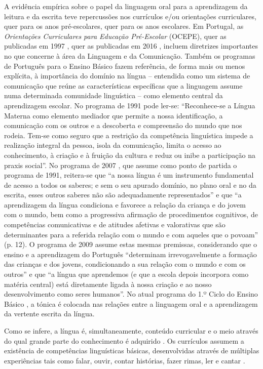 \documentclass[output=paper]{LSP/langsci}
\begin{document}
A evidência empírica sobre o papel da linguagem oral para a aprendizagem da leitura e da escrita teve repercussões nos currículos e/ou orientações curriculares, quer para os anos pré-escolares, quer para os anos escolares. Em Portugal, as \textit{Orientações Curriculares para Educação Pré-Escolar} (OCEPE), quer as publicadas em 1997 \citep{ministerioedu2007}, quer as publicadas em 2016 \citep{silva_etal2016}, incluem diretrizes importantes no que concerne à área da Linguagem e da Comunicação. Também os programas de Português para o Ensino Básico fazem referência, de forma mais ou menos explícita, à importância do domínio na língua – entendida como um sistema de comunicação que reúne as características específicas que a linguagem assume numa determinada comunidade linguística – como elemento central da aprendizagem escolar. No programa de 1991 \citep[97]{ministerioedu1991} pode ler-se: “Reconhece-se a Língua Materna como elemento mediador que permite a nossa identificação, a comunicação com os outros e a descoberta e compreensão do mundo que nos rodeia. Tem-se como seguro que a restrição da competência linguística impede a realização integral da pessoa, isola da comunicação, limita o acesso ao conhecimento, à criação e à fruição da cultura e reduz ou inibe a participação na praxis social”. No programa de 2007 \citep[6]{ministerioedu2007}, que assume como ponto de partida o programa de 1991, reitera-se que “a nossa língua é um instrumento fundamental de acesso a todos os saberes; e sem o seu apurado domínio, no plano oral e no da escrita, esses outros saberes não são adequadamente representados” e que “a aprendizagem da língua condiciona e favorece a relação da criança e do jovem com o mundo, bem como a progressiva afirmação de procedimentos cognitivos, de competências comunicativas e de atitudes afetivas e valorativas que são determinantes para a referida relação com o mundo e com aqueles que o povoam” (p. 12). O programa de 2009 \citep[6]{ministerioedu2009} assume estas mesmas premissas, considerando que o ensino e a aprendizagem do Português “determinam irrevogavelmente a formação das crianças e dos jovens, condicionando a sua relação com o mundo e com os outros” e que “a língua que aprendemos (e que a escola depois incorpora como matéria central) está diretamente ligada à nossa criação e ao nosso desenvolvimento como seres humanos”. No atual programa do 1.º Ciclo do Ensino Básico \citep{buescu_etal2015}, a tónica é colocada nas relações entre a linguagem oral e a aprendizagem da vertente escrita da língua.

Como se infere, a língua é, simultaneamente, conteúdo curricular e o meio através do qual grande parte do conhecimento é adquirido \citep{cazden1973}. Os currículos assumem a existência de competências linguísticas básicas, desenvolvidas através de múltiplas experiências tais como falar, ouvir, contar histórias, fazer rimas, ler e cantar \citep{brockrankin2010,whitehead2007}.
\end{document}
